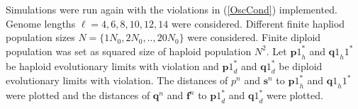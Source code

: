 Simulations were run again with the violations in (\ref{OscCond}) implemented. Genome lengths $\ell = {4, 6, 8, 10, 12, 14}$ were considered. 
Different finite hapliod population sizes $N = \{1N_0, 2N_0,.., 20N_0\}$ were considered. Finite diploid population was set as 
squared size of haploid population $N^2$.\newline
Let ${\bm{p}1}_h^{\ast}$ and ${\bm{q}1}_h1^{\ast}$ be haploid evolutionary limits with violation and ${\bm{p}1}_d^{\ast}$ and ${\bm{q}1}_d^{\ast}$ be diploid 
evolutionary limits with violation. The distances of ${p}^n$ and $\bm{s}^n$ to ${\bm{p}1}_h^{\ast}$ and ${\bm{q}1}_h1^{\ast}$ were plotted and the distances of 
$\bm{q}^n$ and $\bm{f}^n$ to ${\bm{p}1}_d^{\ast}$ and ${\bm{q}1}_d^{\ast}$ were plotted.








 
